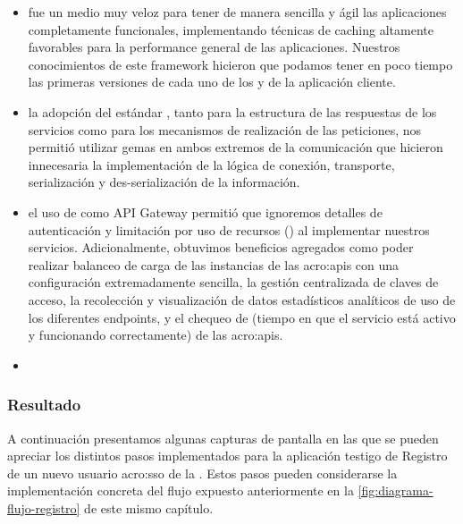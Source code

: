\begin{itemize}
  \item {} fue un medio muy veloz para tener de manera sencilla y ágil las aplicaciones completamente funcionales, implementando técnicas de caching altamente favorables para la performance general de las aplicaciones. Nuestros conocimientos de este framework hicieron que podamos tener en poco tiempo las primeras versiones de cada uno de los  y de la aplicación cliente.

  \item la adopción del estándar , tanto para la estructura de las respuestas de los servicios como para los mecanismos de realización de las peticiones, nos permitió utilizar gemas en ambos extremos de la comunicación que hicieron innecesaria la implementación de la lógica de conexión, transporte, serialización y des-serialización de la información.

  \item el uso de  como API Gateway permitió que ignoremos detalles de autenticación y limitación por uso de recursos () al implementar nuestros servicios. Adicionalmente, obtuvimos beneficios agregados como poder realizar balanceo de carga de las instancias de las \glspl{acro:api} con una configuración extremadamente sencilla, la gestión centralizada de claves de acceso, la recolección y visualización de datos estadísticos analíticos de uso de los diferentes endpoints, y el chequeo de  (tiempo en que el servicio está activo y funcionando correctamente) de las \glspl{acro:api}.

  \item {}
\end{itemize}

\subsubsection{Resultado}

A continuación presentamos algunas capturas de pantalla en las que se pueden apreciar los distintos pasos implementados para la aplicación testigo de Registro de un nuevo usuario \gls{acro:sso} de la \unlp. Estos pasos pueden considerarse la implementación concreta del flujo expuesto anteriormente en la \autoref{fig:diagrama-flujo-registro} de este mismo capítulo.

